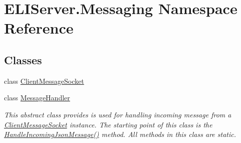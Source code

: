 \hypertarget{namespace_e_l_i_server_1_1_messaging}{}\section{E\+L\+I\+Server.\+Messaging Namespace Reference}
\label{namespace_e_l_i_server_1_1_messaging}
\subsection*{Classes}
\begin{DoxyCompactItemize}
\item 
class \hyperlink{class_e_l_i_server_1_1_messaging_1_1_client_message_socket}{Client\+Message\+Socket}
\item 
class \hyperlink{class_e_l_i_server_1_1_messaging_1_1_message_handler}{Message\+Handler}
\begin{DoxyCompactList}\small\item\em This abstract class provides is used for handling incoming message from a \hyperlink{class_e_l_i_server_1_1_messaging_1_1_client_message_socket}{Client\+Message\+Socket} instance. The starting point of this class is the \hyperlink{class_e_l_i_server_1_1_messaging_1_1_message_handler_a54b8fc68511fe197932338c0ffdb75c0}{Handle\+Incoming\+Json\+Message()} method. All methods in this class are static. \end{DoxyCompactList}\end{DoxyCompactItemize}
